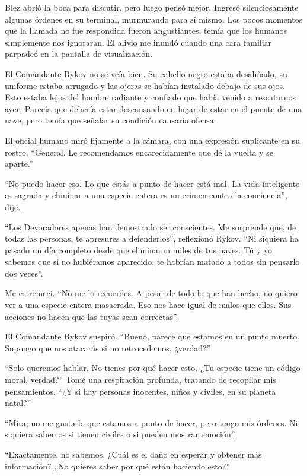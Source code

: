 \documentclass[spanish,12pt,a4paper,oneside,titlepage]{book}
\begin{document}
    Blez abrió la boca para discutir, pero luego pensó mejor. Ingresó silenciosamente algunas órdenes en su terminal, murmurando para sí mismo. Los pocos momentos que la llamada no fue respondida fueron angustiantes; temía que los humanos simplemente nos ignoraran. El alivio me inundó cuando una cara familiar parpadeó en la pantalla de visualización.

    El Comandante Rykov no se veía bien. Su cabello negro estaba desaliñado, su uniforme estaba arrugado y las ojeras se habían instalado debajo de sus ojos. Esto estaba lejos del hombre radiante y confiado que había venido a rescatarnos ayer. Parecía que debería estar descansando en lugar de estar en el puente de una nave, pero temía que señalar su condición causaría ofensa.

    El oficial humano miró fijamente a la cámara, con una expresión suplicante en su rostro. “General. Le recomendamos encarecidamente que dé la vuelta y se aparte.”

    “No puedo hacer eso. Lo que estás a punto de hacer está mal. La vida inteligente es sagrada y eliminar a una especie entera es un crimen contra la conciencia”, dije.

    “Los Devoradores apenas han demostrado ser conscientes. Me sorprende que, de todas las personas, te apresures a defenderlos”, reflexionó Rykov. “Ni siquiera ha pasado un día completo desde que eliminaron miles de tus naves. Tú y yo sabemos que si no hubiéramos aparecido, te habrían matado a todos sin pensarlo dos veces”.

    Me estremecí. “No me lo recuerdes. A pesar de todo lo que han hecho, no quiero ver a una especie entera masacrada. Eso nos hace igual de malos que ellos. Sus acciones no hacen que las tuyas sean correctas”.

    El Comandante Rykov suspiró. “Bueno, parece que estamos en un punto muerto. Supongo que nos atacarás si no retrocedemos, ¿verdad?”

    “Solo queremos hablar. No tienes por qué hacer esto. ¿Tu especie tiene un código moral, verdad?” Tomé una respiración profunda, tratando de recopilar mis pensamientos. “¿Y si hay personas inocentes, niños y civiles, en su planeta natal?”

    “Mira, no me gusta lo que estamos a punto de hacer, pero tengo mis órdenes. Ni siquiera sabemos si tienen civiles o si pueden mostrar emoción”.

    “Exactamente, no sabemos. ¿Cuál es el daño en esperar y obtener más información? ¿No quieres saber por qué están haciendo esto?”
\end{document}
